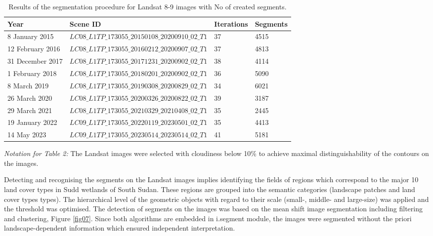 \documentclass[analytics,article,submit,pdftex,moreauthors]{Definitions/mdpi}
\begin{document}
\begin{table}[H] 
\begin{threeparttable}
\centering
\caption{Results of the segmentation procedure for Landsat 8-9 images with No of created segments.\label{tab03}}
\begin{tabularx}{\textwidth}{p{2.5cm}p{6.8cm}p{1.7cm}p{2.5cm}}
\toprule
\textbf{Year} & \textbf{Scene ID} & \textbf{Iterations} & \textbf{Segments} \\
\midrule
8 January 2015 & $LC08\_L1TP\_173055\_20150108\_20200910\_02\_T1$ & 37 & 4515  \\
12 February 2016 & $LC08\_L1TP\_173055\_20160212\_20200907\_02\_T1$ & 37 & 4813  \\
31 December 2017 & $LC08\_L1TP\_173055\_20171231\_20200902\_02\_T1$ & 38 & 4114  \\
1 February 2018 & $LC08\_L1TP\_173055\_20180201\_20200902\_02\_T1$ & 36 & 5090  \\
8 March 2019 & $LC08\_L1TP\_173055\_20190308\_20200829\_02\_T1$ & 34 & 6021  \\
26 March 2020 & $LC08\_L1TP\_173055\_20200326\_20200822\_02\_T1$ & 39 & 3187  \\
29 March 2021 & $LC08\_L1TP\_173055\_20210329\_20210408\_02\_T1$ & 35 & 2445  \\
19 January 2022 & $LC09\_L1TP\_173055\_20220119\_20230501\_02\_T1$ & 35 & 4413  \\
14 May 2023 & $LC09\_L1TP\_173055\_20230514\_20230514\_02\_T1$ & 41 & 5181  \\
\bottomrule
\end{tabularx}
\begin{tablenotes}
      \small
      	\item \emph{Notation for Table 2:} The Landsat images were selected with cloudiness below 10\% to achieve maximal distinguishability of the contours on the images.
    \end{tablenotes}
  \end{threeparttable}
\end{table}

Detecting and recognising the segments on the Landsat images implies identifying the fields of regions which correspond to the major 10 land cover types in Sudd wetlands of South Sudan. These regions are grouped into the semantic categories (landscape patches and land cover types types). The hierarchical level of the geometric objects with regard to their scale (small-, middle- and large-size) was applied and the threshold was optimised. The detection of segments on the images was based on the mean shift image segmentation including filtering and clustering, Figure \ref{fig07}. Since both algorithms are embedded in i.segment module, the images were segmented without the priori landscape-dependent information which ensured independent interpretation.  
\end{document}
